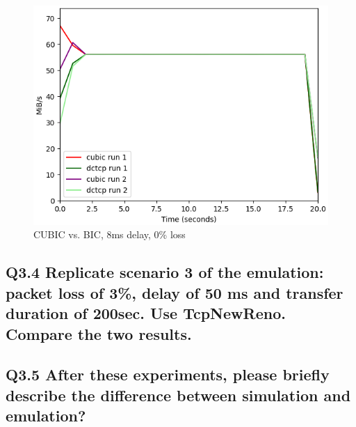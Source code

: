 \documentclass{article}
\begin{document}
\begin{figure}[H]
	\includegraphics[width=\textwidth]{cubic-bic-8-0.png}
	\caption{CUBIC vs. BIC, 8ms delay, 0\% loss}
	\label{fig:cubic-bic-8-0}
\end{figure}


\subsection{Q3.4 Replicate scenario 3 of the emulation: packet loss of 3\%, delay of 50 ms and transfer duration of 200sec. Use TcpNewReno. Compare the two results.}




\subsection{Q3.5 After these experiments, please briefly describe the difference between simulation and emulation?}



\printbibliography
\end{document}
